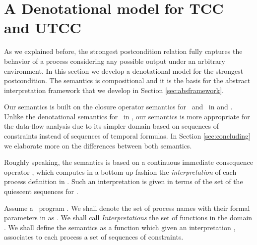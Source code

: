 \documentclass{tlp}
\begin{document}
\section{A Denotational model for TCC and UTCC}\label{sec:denotsem}


As we explained before,  the strongest postcondition relation fully captures the behavior of a process  considering any possible output under an arbitrary environment. In this section we develop a denotational model for the strongest postcondition. The semantics is compositional and it is the basis for the 
abstract interpretation framework that we 
develop in Section \ref{sec:absframework}. 


Our semantics is built on the closure operator semantics for \ccp\ and \tccp\ in \cite{SRP91,tcc-lics94} and \cite{deBoer:97:TOPLAS,NPV02}.
Unlike the denotational semantics for \utcc\ in \cite{Olarte:08:PPDP}, our semantics is more appropriate for the data-flow analysis due to its simpler domain based on sequences of constraints instead of sequences of temporal formulas. In  Section \ref{sec:concluding} we elaborate  more on the differences between both semantics. 

  Roughly speaking,  the semantics is  based on a continuous immediate consequence operator , which computes in a bottom-up fashion  the \emph{interpretation} of each  process definition   in  . Such an interpretation is given in terms of the set of the quiescent sequences for  .

Assume a \utcc\ program . We shall denote  the set of process names with their  formal parameters in  as . We shall call \emph{Interpretations} the set of functions in the domain . We shall define the  semantics as a function  
which  given an interpretation , associates to each process a set of  sequences of constraints.
\end{document}
